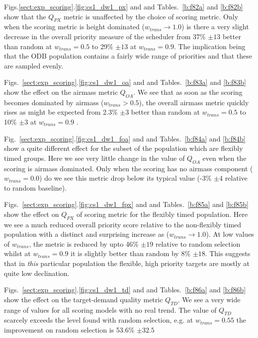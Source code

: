 Figs.\ref{sect:exp_scoring}.\ref{fig:cs1_dw1_px} and  and Tables.~\ref{b:f82a} and \ref{b:f82b} show that the $Q_{PX}$ metric is unaffected by the choice of scoring metric. Only when the scoring metric is height dominated ($w_{trans} \rightarrow 1.0$) is there a very slight decrease in the overall priority measure of the scheduler from 37\% $\pm 13$ better than random at $w_{trans}=0.5$ to 29\% $\pm 13$ at $w_{trans}=0.9$. The implication being that the ODB population contains a fairly wide range of priorities and that these are sampled evenly.

Figs.~\ref{sect:exp_scoring}.\ref{fig:cs1_dw1_oa} and  and Tables.~\ref{b:f83a} and \ref{b:f83b} show the effect on the airmass metric $Q_{OA}$. We see that as soon as the scoring becomes dominated by airmass ($w_{trans}> 0.5$), the overall airmass metric quickly rises as might be expected from 2.3\% $\pm 3$ better than random at $w_{trans}=0.5$ to 10\% $\pm 3$ at $w_{trans}=0.9$ .

Fig.~\ref{sect:exp_scoring}.\ref{fig:cs1_dw1_foa} and  and Tables.~\ref{b:f84a} and \ref{b:f84b} show a quite different effect for the subset of the population which are flexibly timed groups. Here we see very little change in the value of $Q_{OA}$ even when the scoring is airmass dominated. Only when the scoring has no airmass component ($w_{trans}=0.0$) do we see this metric drop below its typical value (-3\% $\pm 4$ relative to random baseline).

Figs.~\ref{sect:exp_scoring}.\ref{fig:cs1_dw1_fpx} and  and Tables.~\ref{b:f85a} and \ref{b:f85b} show the effect on $Q_{PX}$ of scoring metric for the flexibly timed population. Here we see a much reduced overall priority score relative to the non-flexibly timed population with a distinct and surprising increase as ($w_{trans} \rightarrow 1.0$). At low values of $w_{trans}$, the metric is reduced by upto 46\% $\pm 19$ relative to random selection whilst at $w_{trans}=0.9$ it is slightly better than random by 8\% $\pm 18$. This suggests that in \emph{this} particular population the flexible, high priority targets are mostly at quite low declination.

Figs.~\ref{sect:exp_scoring}.\ref{fig:cs1_dw1_td} and  and Tables.~\ref{b:f86a} and \ref{b:f86b} show the effect on the target-demand quality metric $Q_{TD}$. We see a very wide range of values for all scoring models with no real trend. The value of $Q_{TD}$ scarcely exceeds the level found with random selection, e.g. at $w_{trans}=0.55$ the improvement on random selection is 53.6\% $\pm 32.5$  

